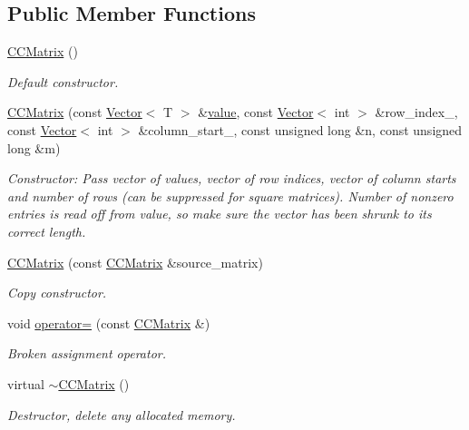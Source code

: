 \subsection*{Public Member Functions}
\begin{DoxyCompactItemize}
\item 
\hyperlink{classoomph_1_1CCMatrix_a16be0ba4cd8d9d5422de26513bab3b41}{C\+C\+Matrix} ()
\begin{DoxyCompactList}\small\item\em Default constructor. \end{DoxyCompactList}\item 
\hyperlink{classoomph_1_1CCMatrix_a4d8bf86e2cb87a710fb5485ac5904274}{C\+C\+Matrix} (const \hyperlink{classoomph_1_1Vector}{Vector}$<$ T $>$ \&\hyperlink{classoomph_1_1SparseMatrix_a3e382ff145082821a6b0b3e63b6aed5d}{value}, const \hyperlink{classoomph_1_1Vector}{Vector}$<$ int $>$ \&row\+\_\+index\+\_\+, const \hyperlink{classoomph_1_1Vector}{Vector}$<$ int $>$ \&column\+\_\+start\+\_\+, const unsigned long \&n, const unsigned long \&m)
\begin{DoxyCompactList}\small\item\em Constructor\+: Pass vector of values, vector of row indices, vector of column starts and number of rows (can be suppressed for square matrices). Number of nonzero entries is read off from value, so make sure the vector has been shrunk to its correct length. \end{DoxyCompactList}\item 
\hyperlink{classoomph_1_1CCMatrix_a815c8a3473ce3b8fe70c682e7591a33d}{C\+C\+Matrix} (const \hyperlink{classoomph_1_1CCMatrix}{C\+C\+Matrix} \&source\+\_\+matrix)
\begin{DoxyCompactList}\small\item\em Copy constructor. \end{DoxyCompactList}\item 
void \hyperlink{classoomph_1_1CCMatrix_ac3612b9c4bbaa346c649cd4790a91df8}{operator=} (const \hyperlink{classoomph_1_1CCMatrix}{C\+C\+Matrix} \&)
\begin{DoxyCompactList}\small\item\em Broken assignment operator. \end{DoxyCompactList}\item 
virtual \hyperlink{classoomph_1_1CCMatrix_a5f6e403c6f6478abe752ca515d3120d9}{$\sim$\+C\+C\+Matrix} ()
\begin{DoxyCompactList}\small\item\em Destructor, delete any allocated memory. \end{DoxyCompactList}\item 

\end{DoxyCompactItemize}
